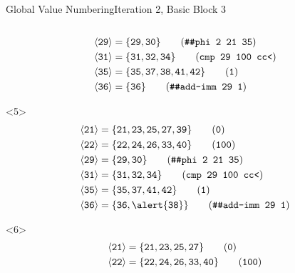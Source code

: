 \documentclass{beamer}
\newcommand{\vn}[1]{\ensuremath{\langle\texttt{#1}\rangle}}
\newcommand{\vreg}[1]{\texttt{#1}}
\begin{document}
\begin{frame}[fragile]{Global Value Numbering}{Iteration 2, Basic Block 3}
\begin{columns}[t,onlytextwidth]
\begin{column}{.5\textwidth}
\begin{onlyenv}
\begin{align*}
          \vn{29} &= \{\vreg{29},
                       \vreg{30}\} \tag{\texttt{\#\#phi 2 21 35}} \\
          \vn{31} &= \{\vreg{31},
                       \vreg{32},
                       \vreg{34}\} \tag{\texttt{cmp 29 100 cc<}} \\
          \vn{35} &= \{\vreg{35},
                       \vreg{37},
                       \vreg{38},
                       \vreg{41},
                       \vreg{42}\} \tag{\texttt{1}} \\
          \vn{36} &= \{\vreg{36}\} \tag{\texttt{\#\#add-imm 29 1}}
        \end{align*}
      \end{onlyenv}
      \begin{onlyenv}<5>
        \begin{align*}
          \vn{21} &= \{\vreg{21},
                       \vreg{23},
                       \vreg{25},
                       \vreg{27},
                       \vreg{39}\} \tag{\texttt{0}} \\
          \vn{22} &= \{\vreg{22},
                       \vreg{24},
                       \vreg{26},
                       \vreg{33},
                       \vreg{40}\} \tag{\texttt{100}} \\
          \vn{29} &= \{\vreg{29},
                       \vreg{30}\} \tag{\texttt{\#\#phi 2 21 35}} \\
          \vn{31} &= \{\vreg{31},
                       \vreg{32},
                       \vreg{34}\} \tag{\texttt{cmp 29 100 cc<}} \\
          \vn{35} &= \{\vreg{35},
                       \vreg{37},
                       \vreg{41},
                       \vreg{42}\} \tag{\texttt{1}} \\
          \vn{36} &= \{\vreg{36},
                       \alert{\vreg{38}}\} \tag{\texttt{\#\#add-imm 29 1}}
        \end{align*}
      \end{onlyenv}
      \begin{onlyenv}<6>
        \begin{align*}
          \vn{21} &= \{\vreg{21},
                       \vreg{23},
                       \vreg{25},
                       \vreg{27}\} \tag{\texttt{0}} \\
          \vn{22} &= \{\vreg{22},
                       \vreg{24},
                       \vreg{26},
                       \vreg{33},
                       \vreg{40}\} \tag{\texttt{100}} \\

\end{align*}
\end{onlyenv}
\end{column}
\end{columns}
\end{frame}
\end{document}
